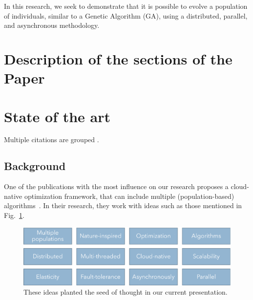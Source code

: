 \documentclass[runningheads]{llncs}
\begin{document}
In this research, we seek to demonstrate that it is possible to evolve a
population of individuals, similar to a Genetic Algorithm (GA), using a
distributed, parallel, and asynchronous methodology.



\section{Description of the sections of the Paper} 

\section{State of the art} 

Multiple citations are grouped \cite{valdez2021container,krejca2020lower,witt2019upper,merelo2016nodio,merelo2016performance,fortin2012deap,stanley2002evolving}.


\subsection{Background}

One of the publications with the most influence on our research proposes a
cloud-native optimization framework, that can include multiple
(population-based) algorithms~\cite{valdez2021container}. In their research, they work with ideas such
as those mentioned in Fig.~\ref{fig1}.

\begin{figure}
    \includegraphics[width=\textwidth]{img/fig1_background.pdf}
    \caption{These ideas planted the seed of thought in our current presentation.} \label{fig1}
    \end{figure}
\end{document}

